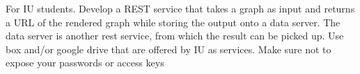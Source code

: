 \begin{exercise}
For IU students. Develop a REST service that takes a graph as input and returns a URL of the rendered graph while storing the output onto a data server. The data server is another rest service, from which the result can be picked up. Use box and/or google drive that are offered by IU as services. Make sure not to expose your passwords or access keys
\end{exercise}

